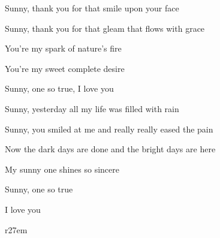 \begin{song}
\bigskip

Sunny,  thank you for that smile upon your face  \par
{}Sunny,  thank you for that gleam that flows with grace  \par
{}You're my spark of nature's fire \par
{}You're my sweet complete desire \par
{}Sunny, one so true, I love you  \par

\bigskip

Sunny,  yesterday all my  life was filled with rain  \par
{}Sunny,  you smiled at me and really really eased the pain  \par
Now the dark days are done and the bright days are here \par
{}My sunny one shines so sincere \par
{}Sunny, one so true \par

\bigskip

 \par
I love you   \par

\normalsize

\begin{wrapfigure}{r}{27em}
\vspace{-5.5em} %
\centering
{}
\par
\par
\end{wrapfigure}

\ %

\vfill




\end{song}
